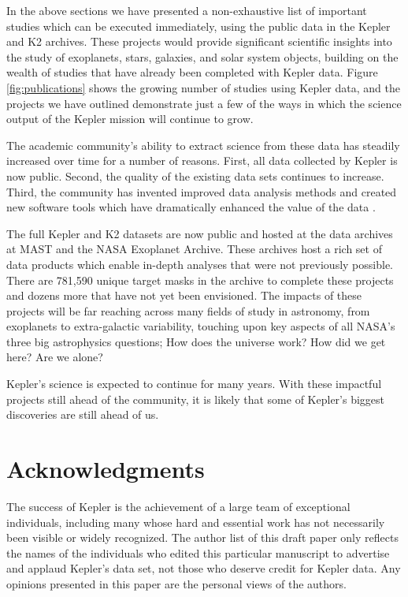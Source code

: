 \documentclass[modern]{aastex62}
\begin{document}
In the above sections we have presented a non-exhaustive list of important studies which can be executed immediately, using the public data in the Kepler and K2 archives. These projects would provide significant scientific insights into the study of exoplanets, stars, galaxies, and solar system objects, building on the wealth of studies that have already been completed with Kepler data. Figure \ref{fig:publications} shows the growing number of studies using Kepler data, and the projects we have outlined demonstrate just a few of the ways in which the science output of the Kepler mission will continue to grow.

The academic community's ability to extract science from these data has steadily increased over time for a number of reasons. First, all data collected by Kepler is now public. Second, the quality of the existing data sets continues to increase. Third, the community has invented improved data analysis methods and created new software tools which have dramatically enhanced the value of the data \citep[e.g.][]{vanderburg2015, aigrain2016, luger2016}. 

The full Kepler and K2 datasets are now public and hosted at the data archives at MAST and the NASA Exoplanet Archive. These archives host a rich set of data products which enable in-depth analyses that were not previously possible. There are 781,590 unique target masks in the archive to complete these projects and dozens more that have not yet been envisioned. The impacts of these projects will be far reaching across many fields of study in astronomy, from exoplanets to extra-galactic variability, touching upon key aspects of all NASA's three big astrophysics questions; How does the universe work? How did we get here? Are we alone? 

Kepler's science is expected to continue for many years. With these impactful projects still ahead of the community, it is likely that some of Kepler's biggest discoveries are still ahead of us.
\\

\vspace{5mm}

\acknowledgments
\section*{Acknowledgments}
The success of Kepler is the achievement of a large team of exceptional individuals, including many whose hard and essential work has not necessarily been visible or widely recognized. The author list of this draft paper only reflects the names of the individuals who edited this particular manuscript to advertise and applaud Kepler's data set, not those who deserve credit for Kepler data. Any opinions presented in this paper are the personal views of the authors.
\end{document}

